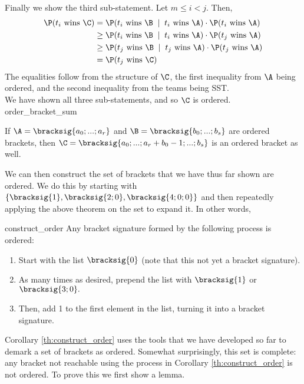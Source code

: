 {{Finally we show the third sub-statement. Let $m \leq i < j.$ Then,
\begin{align*}
    \P(t_i \textrm{ wins }\C) &= \P(t_i \textrm{ wins }\B \;\mid\; t_i \textrm{ wins } \A)\cdot \P(t_i \textrm{ wins } \A)\\
    &\geq \P(t_i \textrm{ wins }\B \;\mid\; t_i \textrm{ wins } \A)\cdot \P(t_j \textrm{ wins } \A)\\
    &\geq \P(t_j \textrm{ wins }\B \;\mid\; t_j \textrm{ wins } \A)\cdot \P(t_j \textrm{ wins } \A)\\
    &= \P(t_j \textrm{ wins }\C)
\end{align*}
The equalities follow from the structure of $\C$, the first inequality from $\A$ being ordered, and the second inequality from the teams being SST.\\

We have shown all three sub-statements, and so $\C$ is ordered.
}{order_bracket_sum}

\begin{corollary}{}{}
    If $\A = \bracksig{a_0; ...; a_r}$ and $\B = \bracksig{b_0; ...; b_s}$ are ordered brackets, then $\C = \bracksig{a_0; ...; a_r + b_0 - 1; ...; b_s}$ is an ordered bracket as well.
\end{corollary}

We can then construct the set of brackets that we have thus far shown are ordered. We do this by starting with $\{\bracksig{1}, \bracksig{2; 0}, \bracksig{4; 0; 0}\}$ and then repeatedly applying the above theorem on the set to expand it. In other words,

\begin{corollary}{}{construct_order}
    Any bracket signature formed by the following process is ordered:
    \begin{enumerate}
        \item Start with the list $\bracksig{0}$ (note that this not yet a bracket signature).
        \item As many times as desired, prepend the list with $\bracksig{1}$ or $\bracksig{3; 0}.$
        \item Then, add 1 to the first element in the list, turning it into a bracket signature.
    \end{enumerate}
\end{corollary}

Corollary \ref{th:construct_order} uses the tools that we have developed so far to demark a set of brackets as ordered. Somewhat surprisingly, this set is complete: any bracket not reachable using the process in Corollary \ref{th:construct_order} is not ordered. To prove this we first show a lemma.

}
